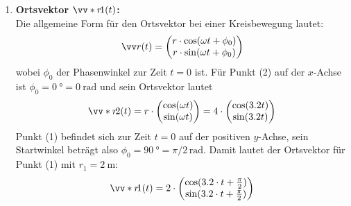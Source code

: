 \documentclass[ngerman]{scrreprt}
\newenvironment{loesungbox}[1]
  {\needspace{5\baselineskip}\begin{loesungboxstyle}[frametitle={#1}]}
  {\end{loesungboxstyle}}
\begin{document}
\begin{loesungbox}{Lösung zu \Cref{aufg:winkelgeschwindigkeit}}
\begin{enumerate}
    \item \textbf{Ortsvektor $\ivecS{r}{1}(t)$:} \\
    Die allgemeine Form für den Ortsvektor bei einer Kreisbewegung lautet:
    \begin{equation}
        \ivec{r}(t) = \icolTwo{r \cdot \cos(\omega t + \phi_0)}{r \cdot \sin(\omega t + \phi_0)}
    \end{equation}
    wobei $\phi_0$ der Phasenwinkel zur Zeit $t=0$ ist. Für Punkt (2) auf der $x$-Achse ist $\phi_0=\SI{0}{\degree} = \SI{0}{\radian}$ und sein Ortsvektor lautet 
    $$ \ivecS{r}{2}(t) = r \cdot  \icolTwo{\cos(\omega t)}{\sin(\omega t)} =  4\cdot  \icolTwo{\cos(\num{3.2} t)}{\sin(\num{3.2} t)}$$
    Punkt (1) befindet sich zur Zeit $t=0$ auf der positiven $y$-Achse, sein Startwinkel beträgt also $\phi_0 = \SI{90}{\degree} = \pi/2\,\si{\radian}$. 
    Damit lautet der Ortsvektor für Punkt (1) mit $r_1=\SI{2}{\meter}$:
    \begin{equation}
        \ivecS{r}{1}(t) = 2 \cdot \icolTwo{\cos(3.2 \cdot t + \frac{\pi}{2})}{\sin(3.2 \cdot t + \frac{\pi}{2})}
    \end{equation}
\end{enumerate}
\end{loesungbox}
\end{document}

